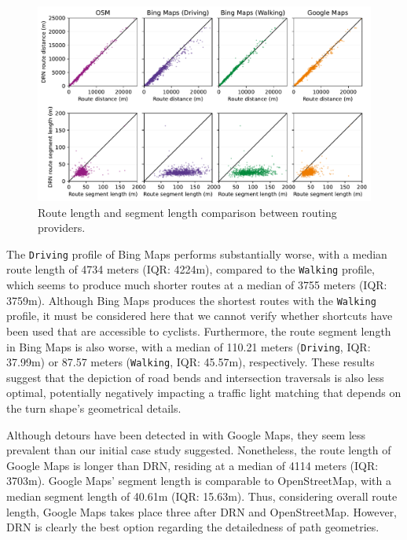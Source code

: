 \begin{figure}[t]
\centering 
\includegraphics[width=\linewidth]{images/routing-distance-comparison.pdf}
\caption{Route length and segment length comparison between routing providers.}
\label{fig:routing-distance-comparison}
\end{figure}

The \texttt{Driving} profile of Bing Maps performs substantially worse, with a median route length of 4734 meters (IQR: 4224m), compared to the \texttt{Walking} profile, which seems to produce much shorter routes at a median of 3755 meters (IQR: 3759m). Although Bing Maps produces the shortest routes with the \texttt{Walking} profile, it must be considered here that we cannot verify whether shortcuts have been used that are accessible to cyclists. Furthermore, the route segment length in Bing Maps is also worse, with a median of 110.21 meters (\texttt{Driving}, IQR: 37.99m) or 87.57 meters (\texttt{Walking}, IQR: 45.57m), respectively. These results suggest that the depiction of road bends and intersection traversals is also less optimal, potentially negatively impacting a traffic light matching that depends on the turn shape's geometrical details. 

Although detours have been detected in  with Google Maps, they seem less prevalent than our initial case study suggested. Nonetheless, the route length of Google Maps is longer than DRN, residing at a median of 4114 meters (IQR: 3703m). Google Maps' segment length is comparable to OpenStreetMap, with a median segment length of 40.61m (IQR: 15.63m). Thus, considering overall route length, Google Maps takes place three after DRN and OpenStreetMap. However, DRN is clearly the best option regarding the detailedness of path geometries.

